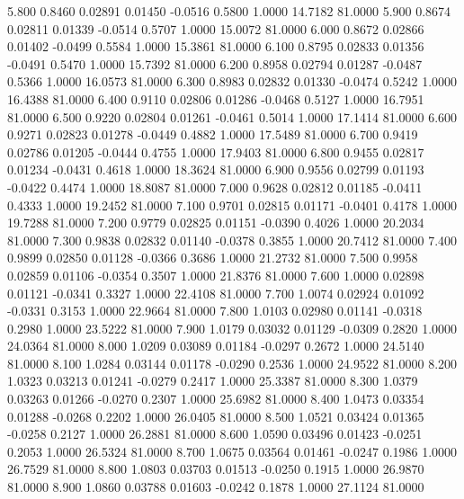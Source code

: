    5.800   0.8460   0.02891   0.01450  -0.0516   0.5800   1.0000  14.7182  81.0000
   5.900   0.8674   0.02811   0.01339  -0.0514   0.5707   1.0000  15.0072  81.0000
   6.000   0.8672   0.02866   0.01402  -0.0499   0.5584   1.0000  15.3861  81.0000
   6.100   0.8795   0.02833   0.01356  -0.0491   0.5470   1.0000  15.7392  81.0000
   6.200   0.8958   0.02794   0.01287  -0.0487   0.5366   1.0000  16.0573  81.0000
   6.300   0.8983   0.02832   0.01330  -0.0474   0.5242   1.0000  16.4388  81.0000
   6.400   0.9110   0.02806   0.01286  -0.0468   0.5127   1.0000  16.7951  81.0000
   6.500   0.9220   0.02804   0.01261  -0.0461   0.5014   1.0000  17.1414  81.0000
   6.600   0.9271   0.02823   0.01278  -0.0449   0.4882   1.0000  17.5489  81.0000
   6.700   0.9419   0.02786   0.01205  -0.0444   0.4755   1.0000  17.9403  81.0000
   6.800   0.9455   0.02817   0.01234  -0.0431   0.4618   1.0000  18.3624  81.0000
   6.900   0.9556   0.02799   0.01193  -0.0422   0.4474   1.0000  18.8087  81.0000
   7.000   0.9628   0.02812   0.01185  -0.0411   0.4333   1.0000  19.2452  81.0000
   7.100   0.9701   0.02815   0.01171  -0.0401   0.4178   1.0000  19.7288  81.0000
   7.200   0.9779   0.02825   0.01151  -0.0390   0.4026   1.0000  20.2034  81.0000
   7.300   0.9838   0.02832   0.01140  -0.0378   0.3855   1.0000  20.7412  81.0000
   7.400   0.9899   0.02850   0.01128  -0.0366   0.3686   1.0000  21.2732  81.0000
   7.500   0.9958   0.02859   0.01106  -0.0354   0.3507   1.0000  21.8376  81.0000
   7.600   1.0000   0.02898   0.01121  -0.0341   0.3327   1.0000  22.4108  81.0000
   7.700   1.0074   0.02924   0.01092  -0.0331   0.3153   1.0000  22.9664  81.0000
   7.800   1.0103   0.02980   0.01141  -0.0318   0.2980   1.0000  23.5222  81.0000
   7.900   1.0179   0.03032   0.01129  -0.0309   0.2820   1.0000  24.0364  81.0000
   8.000   1.0209   0.03089   0.01184  -0.0297   0.2672   1.0000  24.5140  81.0000
   8.100   1.0284   0.03144   0.01178  -0.0290   0.2536   1.0000  24.9522  81.0000
   8.200   1.0323   0.03213   0.01241  -0.0279   0.2417   1.0000  25.3387  81.0000
   8.300   1.0379   0.03263   0.01266  -0.0270   0.2307   1.0000  25.6982  81.0000
   8.400   1.0473   0.03354   0.01288  -0.0268   0.2202   1.0000  26.0405  81.0000
   8.500   1.0521   0.03424   0.01365  -0.0258   0.2127   1.0000  26.2881  81.0000
   8.600   1.0590   0.03496   0.01423  -0.0251   0.2053   1.0000  26.5324  81.0000
   8.700   1.0675   0.03564   0.01461  -0.0247   0.1986   1.0000  26.7529  81.0000
   8.800   1.0803   0.03703   0.01513  -0.0250   0.1915   1.0000  26.9870  81.0000
   8.900   1.0860   0.03788   0.01603  -0.0242   0.1878   1.0000  27.1124  81.0000
